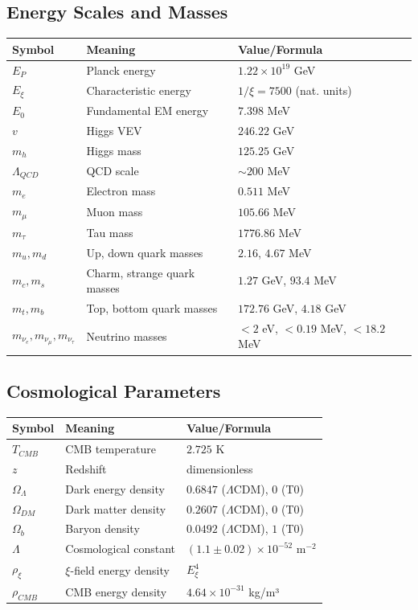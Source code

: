 \subsection{Energy Scales and Masses}
\begin{longtable}{lll}
	\toprule
	\textbf{Symbol} & \textbf{Meaning} & \textbf{Value/Formula} \\
	\midrule
	$E_P$ & Planck energy & $1.22 \times 10^{19}$ GeV \\
	$E_\xi$ & Characteristic energy & $1/\xi = 7500$ (nat. units) \\
	$E_0$ & Fundamental EM energy & $7.398$ MeV \\
	$v$ & Higgs VEV & $246.22$ GeV \\
	$m_h$ & Higgs mass & $125.25$ GeV \\
	$\Lambda_{QCD}$ & QCD scale & $\sim 200$ MeV \\
	$m_e$ & Electron mass & $0.511$ MeV \\
	$m_\mu$ & Muon mass & $105.66$ MeV \\
	$m_\tau$ & Tau mass & $1776.86$ MeV \\
	$m_u, m_d$ & Up, down quark masses & $2.16$, $4.67$ MeV \\
	$m_c, m_s$ & Charm, strange quark masses & $1.27$ GeV, $93.4$ MeV \\
	$m_t, m_b$ & Top, bottom quark masses & $172.76$ GeV, $4.18$ GeV \\
	$m_{\nu_e}, m_{\nu_\mu}, m_{\nu_\tau}$ & Neutrino masses & $< 2$ eV, $< 0.19$ MeV, $< 18.2$ MeV \\
	\bottomrule
\end{longtable}
\normalsize

\subsection{Cosmological Parameters}
\begin{longtable}{lll}
	\toprule
	\textbf{Symbol} & \textbf{Meaning} & \textbf{Value/Formula} \\
	\midrule
	$T_{CMB}$ & CMB temperature & $2.725$ K \\
	$z$ & Redshift & dimensionless \\
	$\Omega_\Lambda$ & Dark energy density & $0.6847$ ($\Lambda$CDM), $0$ (T0) \\
	$\Omega_{DM}$ & Dark matter density & $0.2607$ ($\Lambda$CDM), $0$ (T0) \\
	$\Omega_b$ & Baryon density & $0.0492$ ($\Lambda$CDM), $1$ (T0) \\
	$\Lambda$ & Cosmological constant & $(1.1 \pm 0.02) \times 10^{-52}$ m$^{-2}$ \\
	$\rho_\xi$ & $\xi$-field energy density & $E_\xi^4$ \\
	$\rho_{CMB}$ & CMB energy density & $4.64 \times 10^{-31}$ kg/m³ \\
	\bottomrule
\end{longtable}
\normalsize

